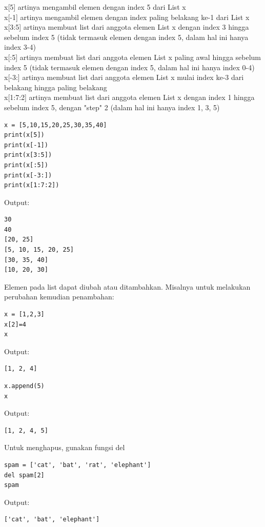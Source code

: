 \begin{enumerate}
x[5] artinya mengambil elemen dengan index 5 dari List x\\

x[-1] artinya mengambil elemen dengan index paling belakang ke-1 dari List x\\

x[3:5] artinya membuat list dari anggota elemen List x dengan index 3 hingga sebelum index 5 (tidak termasuk elemen dengan index 5, dalam hal ini hanya index 3-4)\\

x[:5] artinya membuat list dari anggota elemen List x paling awal hingga sebelum index 5 (tidak termasuk elemen dengan index 5, dalam hal ini hanya index 0-4)\\

x[-3:] artinya membuat list dari anggota elemen List x mulai index ke-3 dari belakang hingga paling belakang\\

x[1:7:2] artinya membuat list dari anggota elemen List x dengan index 1 hingga sebelum index 5, dengan "step" 2 (dalam hal ini hanya index 1, 3, 5)
\begin{verbatim}
x = [5,10,15,20,25,30,35,40]
print(x[5])
print(x[-1])
print(x[3:5])
print(x[:5])
print(x[-3:])
print(x[1:7:2])
\end{verbatim}
Output:
\begin{verbatim}
30
40
[20, 25]
[5, 10, 15, 20, 25]
[30, 35, 40]
[10, 20, 30]
\end{verbatim}

Elemen pada list dapat diubah atau ditambahkan. Misalnya untuk melakukan perubahan kemudian penambahan:
\begin{verbatim}
x = [1,2,3]
x[2]=4
x
\end{verbatim}
Output:
\begin{verbatim}
[1, 2, 4]
\end{verbatim}
\begin{verbatim}
x.append(5)
x
\end{verbatim}
Output:
\begin{verbatim}
[1, 2, 4, 5]
\end{verbatim}

Untuk menghapus, gunakan fungsi del
\begin{verbatim}
spam = ['cat', 'bat', 'rat', 'elephant']
del spam[2]
spam
\end{verbatim}
Output:
\begin{verbatim}
['cat', 'bat', 'elephant']
\end{verbatim}


\end{enumerate}
